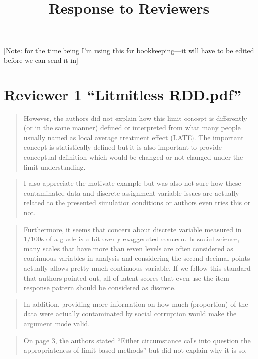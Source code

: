 \documentclass[12pt]{article}
\title{Response to Reviewers}
\begin{document}
\maketitle

[Note: for the time being I'm using this for bookkeeping---it will
have to be edited before we can send it in]\\

\section{Reviewer 1 ``Litmitless RDD.pdf''}

\begin{quote}
However, the authors did not explain how this limit concept is
differently (or in the same manner) defined or interpreted from what
many people usually named as local average treatment effect
(LATE). The important concept is statistically defined but it is also
important to provide conceptual definition which would be changed or
not changed under the limit understanding.
\end{quote}

\begin{quote}
I also appreciate the motivate example but was also not sure how these
contaminated data and discrete assignment variable issues are actually
related to the presented simulation conditions or authors even tries
this or not.
\end{quote}

\begin{quote}
Furthermore, it seems that concern about discrete variable measured in
1/100s of a grade is a bit overly exaggerated concern. In social
science, many scales that have more than seven levels are often
considered as continuous variables in analysis and considering the
second decimal points actually allows pretty much continuous
variable. If we follow this standard that authors pointed out, all of
latent scores that even use the item response pattern should be
considered as discrete.
\end{quote}

\begin{quote}
In addition, providing more information on how much (proportion) of
the data were actually contaminated by social corruption would make
the argument mode valid.
\end{quote}

\begin{quote}
On page 3, the authors stated “Either circumstance calls into question
the appropriateness of limit-based methods” but did not explain why it
is so.
\end{quote}
\end{document}
